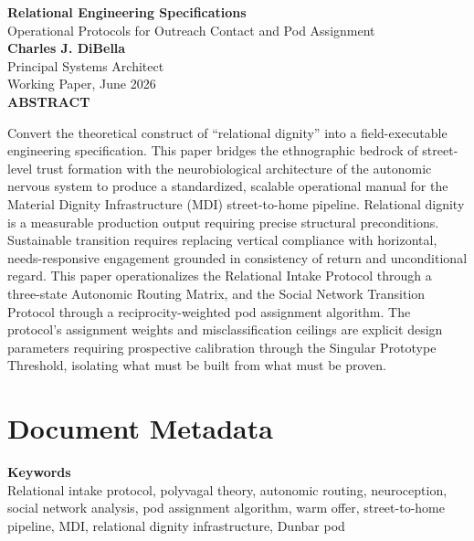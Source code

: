 \documentclass[12pt, letterpaper]{article}
\begin{document}
\captionsetup[table]{labelfont=normalfont, labelsep=period, skip=6pt}

\begin{titlepage}
\begin{center}
{\LARGE \textbf{Relational Engineering Specifications}}\\[6pt]
{\large Operational Protocols for Outreach Contact and Pod Assignment}\\[0.5cm]
{\normalsize \textbf{Charles J. DiBella}}\\[0.01cm]
{\normalsize Principal Systems Architect}\\[0.01cm]
{\normalsize Working Paper, June 2026}\\[0.3cm]
\textbf{ABSTRACT}
\vspace{0.2cm}
\end{center}
\begin{minipage}{0.95\textwidth}
\noindent
Convert the theoretical construct of ``relational dignity'' into a field-executable engineering specification. This paper bridges the ethnographic bedrock of street-level trust formation with the neurobiological architecture of the autonomic nervous system to produce a standardized, scalable operational manual for the Material Dignity Infrastructure (MDI) street-to-home pipeline. Relational dignity is a measurable production output requiring precise structural preconditions. Sustainable transition requires replacing vertical compliance with horizontal, needs-responsive engagement grounded in consistency of return and unconditional regard. This paper operationalizes the Relational Intake Protocol through a three-state Autonomic Routing Matrix, and the Social Network Transition Protocol through a reciprocity-weighted pod assignment algorithm. The protocol's assignment weights and misclassification ceilings are explicit design parameters requiring prospective calibration through the Singular Prototype Threshold, isolating what must be built from what must be proven.
\end{minipage}
\end{titlepage}


\newpage
\section*{Document Metadata}

\noindent\textbf{Keywords}\\[1pt]
Relational intake protocol, polyvagal theory, autonomic routing, neuroception, social network analysis, pod assignment algorithm, warm offer, street-to-home pipeline, MDI, relational dignity infrastructure, Dunbar pod
\end{document}
